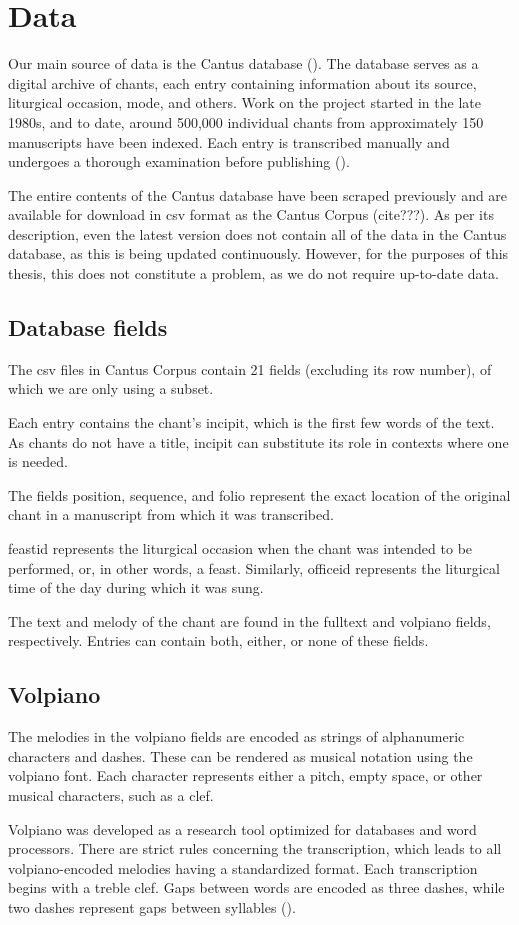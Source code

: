 \chapter{Data}

Our main source of data is the Cantus database (\cite{cantus_db}). The database serves as a digital archive of chants, each entry containing
information about its source, liturgical occasion, mode, and others. Work on the project started in the late 1980s, and to date, around 500,000
individual chants from approximately 150 manuscripts have been indexed. Each entry is transcribed manually and undergoes a thorough examination
before publishing (\cite{cantus_lacoste}).

The entire contents of the Cantus database have been scraped previously and are available for download in csv format as the Cantus Corpus (cite???).
As per its description, even the latest version does not contain all of the data in the Cantus database, as this is being updated continuously. However,
for the purposes of this thesis, this does not constitute a problem, as we do not require up-to-date data.

\section{Database fields}

The csv files in Cantus Corpus contain 21 fields (excluding its row number), of which we are only using a subset.

Each entry contains the chant's incipit, which is the first few words of the text. As chants do not have a title, incipit can substitute its role
in contexts where one is needed.

The fields position, sequence, and folio represent the exact location of the original chant in a manuscript from which it was transcribed.

feastid represents the liturgical occasion when the chant was intended to be performed, or, in other words, a feast. Similarly, officeid represents
the liturgical time of the day during which it was sung.

The text and melody of the chant are found in the fulltext and volpiano fields, respectively. Entries can contain both, either, or none of these fields.

\section{Volpiano}

The melodies in the volpiano fields are encoded as strings of alphanumeric characters and dashes. These can be rendered as musical notation using
the volpiano font. Each character represents either a pitch, empty space, or other musical characters, such as a clef.

Volpiano was developed as a research tool optimized for databases and word processors. There are strict rules concerning the transcription, which leads
to all volpiano-encoded melodies having a standardized format. Each transcription begins with a treble clef. Gaps between words are encoded as three
dashes, while two dashes represent gaps between syllables (\cite{volpiano}).

